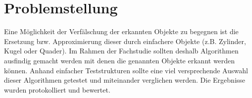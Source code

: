 
\chapter{Problemstellung}
Eine Möglichkeit der Verfälschung der erkannten Objekte zu begegnen ist die Ersetzung bzw. Approximierung dieser durch einfachere Objekte (z.B. Zylinder, Kugel oder Quader). Im Rahmen der Fachstudie sollten deshalb Algorithmen ausfindig gemacht werden mit denen die genannten Objekte erkannt werden können. Anhand einfacher Teststrukturen sollte eine viel versprechende Auswahl dieser Algorithmen getestet und miteinander verglichen werden. Die Ergebnisse wurden protokolliert und bewertet.

